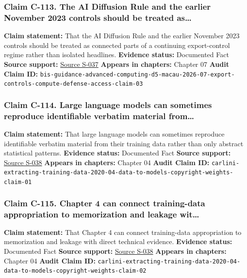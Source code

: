 \documentclass[
  american,
  11pt,
  letterpaper,
]{article}
\begin{document}
\subsubsection{Claim C-113. The AI Diffusion Rule and the earlier
November 2023 controls should be treated
as\ldots{}}\label{claim-c-113-the-ai-diffusion-rule-and-the-earlier-november-2023-controls-should-be-treated-as}

\textbf{Claim statement:} That the AI Diffusion Rule and the earlier
November 2023 controls should be treated as connected parts of a
continuing export-control regime rather than isolated headlines.
\textbf{Evidence status:} Documented Fact \textbf{Source support:}
\hyperref[source-s-037-guidance-regarding-enforcement-of-license-requirements-for-advanced-computing-items-for-entities-headquartered-in-country-group-d-5-and-macau]{Source
S-037} \textbf{Appears in chapters:} Chapter 07 \textbf{Audit Claim ID:}
\texttt{bis-guidance-advanced-computing-d5-macau-2026-07-export-controls-compute-defense-access-claim-03}

\subsubsection{Claim C-114. Large language models can sometimes
reproduce identifiable verbatim material
from\ldots{}}\label{claim-c-114-large-language-models-can-sometimes-reproduce-identifiable-verbatim-material-from}

\textbf{Claim statement:} That large language models can sometimes
reproduce identifiable verbatim material from their training data rather
than only abstract statistical patterns. \textbf{Evidence status:}
Documented Fact \textbf{Source support:}
\hyperref[source-s-038-extracting-training-data-from-large-language-models]{Source
S-038} \textbf{Appears in chapters:} Chapter 04 \textbf{Audit Claim ID:}
\texttt{carlini-extracting-training-data-2020-04-data-to-models-copyright-weights-claim-01}

\subsubsection{Claim C-115. Chapter 4 can connect training-data
appropriation to memorization and leakage
wit\ldots{}}\label{claim-c-115-chapter-4-can-connect-training-data-appropriation-to-memorization-and-leakage-wit}

\textbf{Claim statement:} That Chapter 4 can connect training-data
appropriation to memorization and leakage with direct technical
evidence. \textbf{Evidence status:} Documented Fact \textbf{Source
support:}
\hyperref[source-s-038-extracting-training-data-from-large-language-models]{Source
S-038} \textbf{Appears in chapters:} Chapter 04 \textbf{Audit Claim ID:}
\texttt{carlini-extracting-training-data-2020-04-data-to-models-copyright-weights-claim-02}
\end{document}
